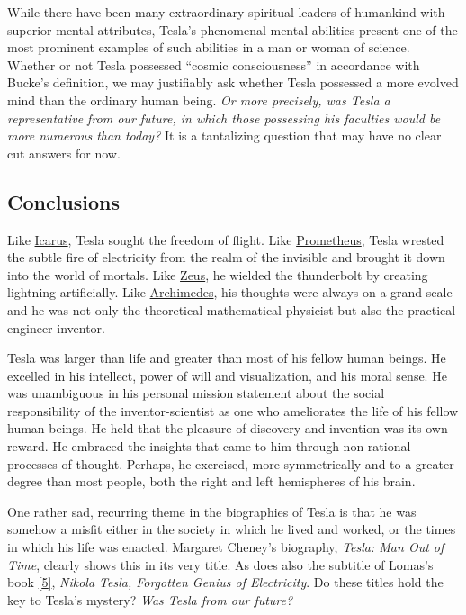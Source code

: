 \documentclass[
  12pt,
  british,
  a4paper,
  rgb,
  dvipsnames,
  svgnames,
  hyphens]{article}
\begin{document}
While there have been many extraordinary spiritual leaders of humankind
with superior mental attributes, Tesla's phenomenal mental abilities
present one of the most prominent examples of such abilities in a man or
woman of science. Whether or not Tesla possessed ``cosmic
consciousness'' in accordance with Bucke's definition, we may
justifiably ask whether Tesla possessed a more evolved mind than the
ordinary human being. \emph{Or more precisely, was Tesla a
representative from our future, in which those possessing his faculties
would be more numerous than today?} It is a tantalizing question that
may have no clear cut answers for now.

\hypertarget{conclusions}{%
\subsection{Conclusions}\label{conclusions}}

Like \href{https://en.wikipedia.org/wiki/Icarus}{Icarus}, Tesla sought
the freedom of flight. Like
\href{https://en.wikipedia.org/wiki/Prometheus}{Prometheus}, Tesla
wrested the subtle fire of electricity from the realm of the invisible
and brought it down into the world of mortals. Like
\href{https://en.wikipedia.org/wiki/Zeus}{Zeus}, he wielded the
thunderbolt by creating lightning artificially. Like
\href{https://en.wikipedia.org/wiki/Archimedes}{Archimedes}, his
thoughts were always on a grand scale and he was not only the
theoretical mathematical physicist but also the practical
engineer-inventor.

Tesla was larger than life and greater than most of his fellow human
beings. He excelled in his intellect, power of will and visualization,
and his moral sense. He was unambiguous in his personal mission
statement about the social responsibility of the inventor-scientist as
one who ameliorates the life of his fellow human beings. He held that
the pleasure of discovery and invention was its own reward. He embraced
the insights that came to him through non-rational processes of thought.
Perhaps, he exercised, more symmetrically and to a greater degree than
most people, both the right and left hemispheres of his brain.

One rather sad, recurring theme in the biographies of Tesla is that he
was somehow a misfit either in the society in which he lived and worked,
or the times in which his life was enacted. Margaret Cheney's biography,
\emph{Tesla: Man Out of Time}, clearly shows this in its very title. As
does also the subtitle of Lomas's book
\protect\hyperlink{ref-lomas99}{{[}5{]}}, \emph{Nikola Tesla, Forgotten
Genius of Electricity}. Do these titles hold the key to Tesla's mystery?
\emph{Was Tesla from our future?}
\end{document}
